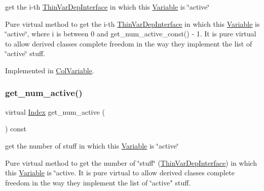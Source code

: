 get the i-\/th \mbox{\hyperlink{class_s_m_spp__di__unipi__it_1_1_thin_var_dep_interface}{Thin\+Var\+Dep\+Interface}} in which this \mbox{\hyperlink{class_s_m_spp__di__unipi__it_1_1_variable}{Variable}} is \char`\"{}active\char`\"{} 

Pure virtual method to get the i-\/th \mbox{\hyperlink{class_s_m_spp__di__unipi__it_1_1_thin_var_dep_interface}{Thin\+Var\+Dep\+Interface}} in which this \mbox{\hyperlink{class_s_m_spp__di__unipi__it_1_1_variable}{Variable}} is \char`\"{}active\char`\"{}, where i is between 0 and get\+\_\+num\+\_\+active\+\_\+const() -\/ 1. It is pure virtual to allow derived classes complete freedom in the way they implement the list of \char`\"{}active\char`\"{} stuff. 

Implemented in \mbox{\hyperlink{class_s_m_spp__di__unipi__it_1_1_col_variable_a0a386ea1a060cc6aee2856da46a2df5c}{Col\+Variable}}.

\mbox{\label{class_s_m_spp__di__unipi__it_1_1_variable_ad5813b427b1bca3b32f25a97be80c3fe}} 
\subsubsection{\texorpdfstring{get\+\_\+num\+\_\+active()}{get\_num\_active()}}
{\footnotesize\ttfamily virtual \mbox{\hyperlink{class_s_m_spp__di__unipi__it_1_1_variable_ad53d6229d7ec28555a9c9c2fd9abf773}{Index}} get\+\_\+num\+\_\+active (\begin{DoxyParamCaption}\item[{void}]{ }\end{DoxyParamCaption}) const\hspace{0.3cm}{\ttfamily [pure virtual]}}



get the number of stuff in which this \mbox{\hyperlink{class_s_m_spp__di__unipi__it_1_1_variable}{Variable}} is \char`\"{}active\char`\"{} 

Pure virtual method to get the number of \char`\"{}stuff\char`\"{} (\mbox{\hyperlink{class_s_m_spp__di__unipi__it_1_1_thin_var_dep_interface}{Thin\+Var\+Dep\+Interface}}) in which this \mbox{\hyperlink{class_s_m_spp__di__unipi__it_1_1_variable}{Variable}} is \char`\"{}active. It is pure virtual to allow derived
classes complete freedom in the way they implement the list of \char`\"{}active" stuff. 

